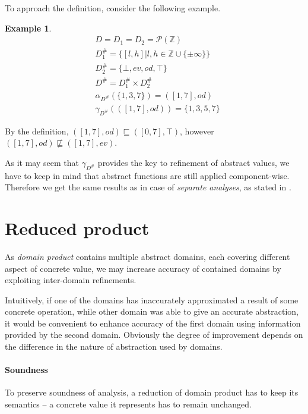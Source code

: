 \documentclass[12pt,oneside]{fithesis2}
\theoremstyle{definition}
\newtheorem{exmp}{Example}[section]
\begin{document}
To approach the definition, consider the following example.

\begin{exmp}
  \begin{align*}
    &D = D_1 = D_2 = \mathcal P(\mathbb Z)\\
    &D^\#_1 = \{[l,h] | l,h \in \mathbb{Z} \cup \{\pm\infty\}\}\\
    &D^\#_2 = \{\bot, ev, od, \top\}\\
    &D^\# = D^\#_1 \times D^\#_2\\
    &\alpha_{D^\#}(\{1,3,7\}) = \left( [1,7], od \right)\\
    &\gamma_{D^\#}(\left( [1, 7], od \right)) = \{1,3,5,7\}
  \end{align*}

  By the definition, $\left( [1, 7], od \right) \sqsubseteq \left( [0, 7], \top \right)$, however $\left( [1, 7], od \right) \not\sqsubseteq \left( [1, 7], ev \right)$.
\end{exmp}

As it may seem that $\gamma_{D^\#}$ provides the key to refinement of abstract values, we have to keep in mind that abstract functions are still applied component-wise. Therefore we get the same results as in case of \textit{separate analyses}, as stated in \cite{CousotCousot79-1}.

\section{Reduced product}\label{sec:reduced-cardinality-product}

As \textit{domain product} contains multiple abstract domains, each covering different aspect of concrete value, we may increase accuracy of contained domains by exploiting inter-domain refinements.

Intuitively, if one of the domains has inaccurately approximated a result of some concrete operation, while other domain was able to give an accurate abstraction, it would be convenient to enhance accuracy of the first domain using information provided by the second domain. Obviously the degree of improvement depends on the difference in the nature of abstraction used by domains.

\paragraph{Soundness} To preserve soundness of analysis, a reduction of domain product has to keep its semantics -- a concrete value it represents has to remain unchanged.
\end{document}
